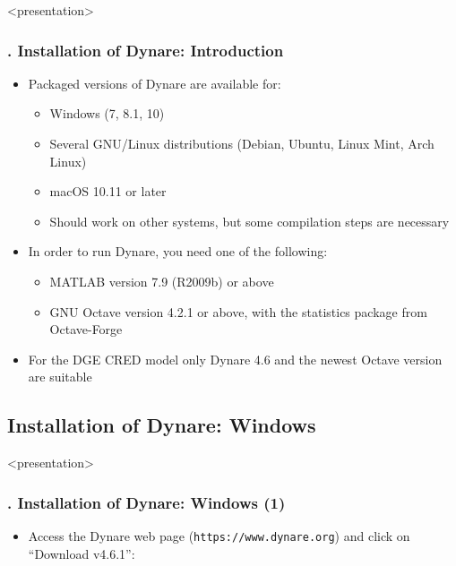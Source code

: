 \documentclass[11pt,aspectratio=169]{beamer}
\begin{document}
\begin{frame}<presentation>
\frametitle{{\thesection.\thesubsection} Installation of Dynare: Introduction}
	\begin{itemize}
		\item Packaged versions of Dynare are available for:
		\begin{itemize}
			\item Windows (7, 8.1, 10)
			\item Several GNU/Linux distributions (Debian, Ubuntu, Linux Mint, Arch Linux)
			\item macOS 10.11 or later
			\item Should work on other systems, but some compilation steps are necessary
		\end{itemize}
	\item In order to run Dynare, you need one of the following:
		\begin{itemize}
			\item MATLAB version 7.9 (R2009b) or above
			\item GNU Octave version 4.2.1 or above, with the statistics package from Octave-Forge
		\end{itemize}
	\item For the DGE CRED model only Dynare 4.6 and the newest Octave version are suitable
	\end{itemize}
\end{frame}


\subsection{Installation of Dynare: Windows}

\begin{frame}<presentation>
\frametitle{{\thesection.\thesubsection} Installation of Dynare: Windows (1)}
	\begin{itemize}
			\item Access the Dynare web page (\texttt{https://www.dynare.org}) and click on ``Download v4.6.1'': 
				\begin{figure}
		\end{figure}
	\end{itemize}
\end{frame}
\end{document}
